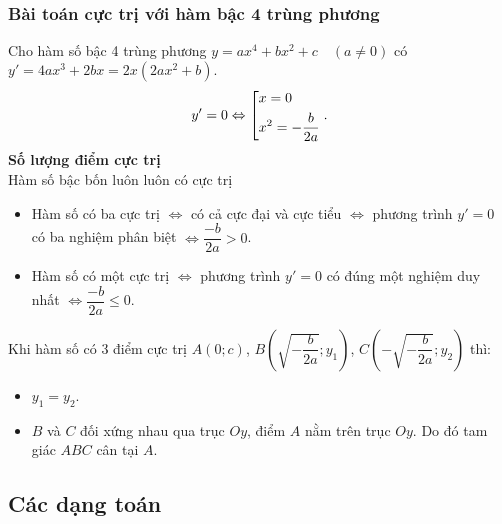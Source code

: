 \subsubsection{Bài toán cực trị với hàm bậc 4 trùng phương}
Cho hàm số bậc 4 trùng phương $y=ax^4+bx^2+c \quad (a \neq 0)$ có $ y'=4ax^3+2bx=2x(2ax^2+b).$\\
$$y'=0\Leftrightarrow \left[\begin{aligned}&x = 0\\&x^{2}=-\dfrac{b}{2a}\end{aligned}\right..$$
\textbf{Số lượng điểm cực trị}\\
Hàm số bậc bốn luôn luôn có cực trị
\begin{itemize}
	\item Hàm số có ba cực trị $\Leftrightarrow$ có cả cực đại và cực tiểu $\Leftrightarrow$ phương trình $y'=0$ có ba nghiệm phân biệt $\Leftrightarrow \dfrac{-b}{2a}>0$.
	\item Hàm số có một cực trị $\Leftrightarrow$ phương trình $y'=0$ có đúng một nghiệm duy nhất $\Leftrightarrow \dfrac{-b}{2a} \leq 0$.
\end{itemize}
\begin{note}
	Khi hàm số có 3 điểm cực trị  $A(0;c)$, $B\left(\sqrt{-\dfrac{b}{2a}};y_1\right)$, $C\left(-\sqrt{-\dfrac{b}{2a}};y_2\right)$ thì:
	\begin{itemize}
		\item $y_1=y_2$.
		\item $B$ và $C$ đối xứng nhau qua trục $Oy$, điểm $A$ nằm trên trục $Oy$. Do đó tam giác $ABC$ cân tại $A$.
	\end{itemize}
\end{note}
\subsection{Các dạng toán}

